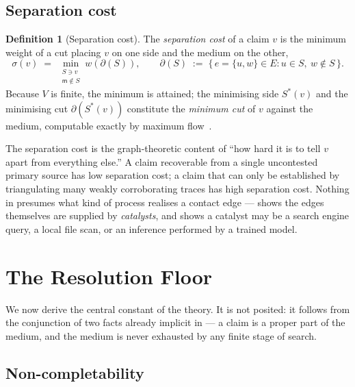 \documentclass[11pt,twocolumn,a4paper]{article}
\theoremstyle{thmstyle}
\theoremstyle{definition}
\newtheorem{definition}[theorem]{Definition}
\theoremstyle{remark}
\newcommand{\V}{V}
\newcommand{\E}{E}
\newcommand{\wt}{w}
\newcommand{\med}{\mathsf{m}}
\newcommand{\cut}{\partial}
\newcommand{\str}{\sigma}
\begin{document}
\subsection{Separation cost}

\begin{definition}[Separation cost]
\label{def:sepcost}
The \emph{separation cost} of a claim $v$ is the minimum weight of a cut
placing $v$ on one side and the medium on the other,
\[
\str(v)\;=\;\min_{\substack{S\ni v\\ \med\notin S}}\wt(\cut(S)),
\qquad
\cut(S)\;:=\;\{\,e=\{u,w\}\in\E : u\in S,\ w\notin S\,\}.
\]
Because $\V$ is finite, the minimum is attained; the minimising side
$S^{\ast}(v)$ and the minimising cut $\cut(S^{\ast}(v))$ constitute the
\emph{minimum cut} of $v$ against the medium, computable exactly by
maximum flow~\citep{fordfulkerson1956,mengertheorem}.
\end{definition}

The separation cost is the graph-theoretic content of ``how hard it is to
tell $v$ apart from everything else.'' A claim recoverable from a single
uncontested primary source has low separation cost; a claim that can only
be established by triangulating many weakly corroborating traces has high
separation cost. Nothing in  presumes what kind of
process realises a contact edge ---  shows the edges
themselves are supplied by \emph{catalysts}, and 
shows a catalyst may be a search engine query, a local file scan, or an
inference performed by a trained model.

\section{The Resolution Floor}
\label{sec:floor}

We now derive the central constant of the theory. It is not posited: it
follows from the conjunction of two facts already implicit in
 --- a claim is a proper part of the medium, and the
medium is never exhausted by any finite stage of search.

\subsection{Non-completability}
\end{document}
